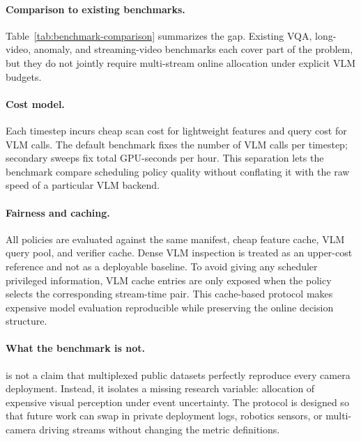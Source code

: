 \paragraph{Comparison to existing benchmarks.}
Table~\ref{tab:benchmark-comparison} summarizes the gap. Existing VQA, long-video, anomaly, and streaming-video benchmarks each cover part of the problem, but they do not jointly require multi-stream online allocation under explicit VLM budgets.

\begin{table}[t]
\centering
\caption{Benchmark families and whether they evaluate the properties required by budgeted multi-stream VLM monitoring.}
\label{tab:benchmark-comparison}

\end{table}

\paragraph{Cost model.}
Each timestep incurs cheap scan cost for lightweight features and query cost for VLM calls. The default benchmark fixes the number of VLM calls per timestep; secondary sweeps fix total GPU-seconds per hour. This separation lets the benchmark compare scheduling policy quality without conflating it with the raw speed of a particular VLM backend.

\paragraph{Fairness and caching.}
All policies are evaluated against the same manifest, cheap feature cache, VLM query pool, and verifier cache. Dense VLM inspection is treated as an upper-cost reference and not as a deployable baseline. To avoid giving any scheduler privileged information, VLM cache entries are only exposed when the policy selects the corresponding stream-time pair. This cache-based protocol makes expensive model evaluation reproducible while preserving the online decision structure.

\paragraph{What the benchmark is not.}
\benchmark{} is not a claim that multiplexed public datasets perfectly reproduce every camera deployment. Instead, it isolates a missing research variable: allocation of expensive visual perception under event uncertainty. The protocol is designed so that future work can swap in private deployment logs, robotics sensors, or multi-camera driving streams without changing the metric definitions.
